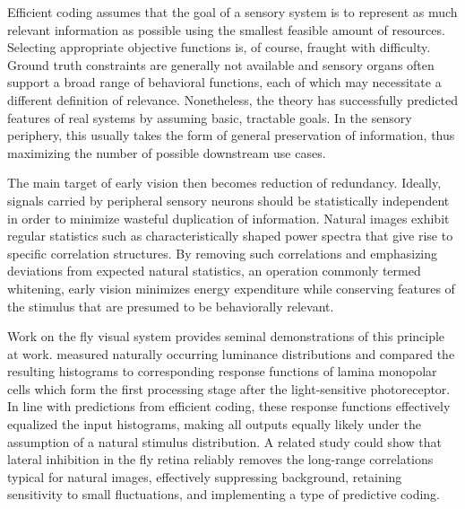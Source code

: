 Efficient coding assumes that the goal of a sensory system is to represent as much relevant information as possible using the smallest feasible amount of resources. Selecting appropriate objective functions is, of course, fraught with difficulty. Ground truth constraints are generally not available and sensory organs often support a broad range of behavioral functions, each of which may necessitate a different definition of relevance. Nonetheless, the theory has successfully predicted features of real systems by assuming basic, tractable goals. In the sensory periphery, this usually takes the form of general preservation of information, thus maximizing the number of possible downstream use cases.

The main target of early vision then becomes reduction of redundancy. Ideally, signals carried by peripheral sensory neurons should be statistically independent in order to minimize wasteful duplication of information. Natural images exhibit regular statistics such as characteristically shaped power spectra that give rise to specific correlation structures. By removing such correlations and emphasizing deviations from expected natural statistics, an operation commonly termed whitening, early vision minimizes energy expenditure while conserving features of the stimulus that are presumed to be behaviorally relevant.

Work on the fly visual system provides seminal demonstrations of this principle at work. \citet{Laughlin:1981wn} measured naturally occurring luminance distributions and compared the resulting histograms to corresponding response functions of lamina monopolar cells which form the first processing stage after the light-sensitive photoreceptor. In line with predictions from efficient coding, these response functions effectively equalized the input histograms, making all outputs equally likely under the assumption of a natural stimulus distribution. A related study \citep{Srinivasan:1982uq} could show that lateral inhibition in the fly retina reliably removes the long-range correlations typical for natural images, effectively suppressing background, retaining sensitivity to small fluctuations, and implementing a type of predictive coding.

